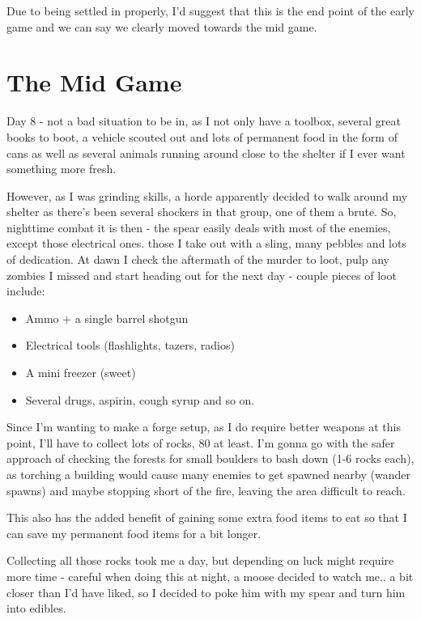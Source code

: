 Due to being settled in properly, I'd suggest that this is the end point of the early game and we can say we clearly moved towards the mid game.

\section{The Mid Game}

Day 8 - not a bad situation to be in, as I not only have a toolbox, several great books to boot, a vehicle scouted out and lots of permanent food in the form of cans as well as several animals running around close to the shelter if I ever want something more fresh.

However, as I was grinding skills, a horde apparently decided to walk around my shelter as there's been several shockers in that group, one of them a brute. So, nighttime combat it is then - the spear easily deals with most of the enemies, except those electrical ones. those I take out with a sling, many pebbles and lots of dedication. At dawn I check the aftermath of the murder to loot, pulp any zombies I missed and start heading out for the next day - couple pieces of loot include:

\begin{itemize}
\item Ammo + a single barrel shotgun
\item Electrical tools (flashlights, tazers, radios)
\item A mini freezer (sweet)
\item Several drugs, aspirin, cough syrup and so on.
\end{itemize}

Since I'm wanting to make a forge setup, as I do require better weapons at this point, I'll have to collect lots of rocks, 80 at least. I'm gonna go with the safer approach of checking the forests for small boulders to bash down (1-6 rocks each), as torching a building would cause many enemies to get spawned nearby (wander spawns) and maybe stopping short of the fire, leaving the area difficult to reach.

This also has the added benefit of gaining some extra food items to eat so that I can save my permanent food items for a bit longer.

Collecting all those rocks took me a day, but depending on luck might require more time - careful when doing this at night, a moose decided to watch me.. a bit closer than I'd have liked, so I decided to poke him with my spear and turn him into edibles.


